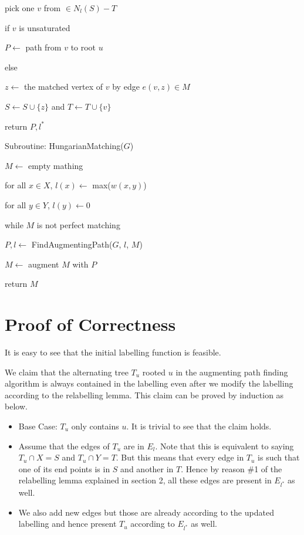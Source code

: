 \documentclass{article}
\begin{document}
\hspace{2cm} pick one $v$ from $\in N_l(S)-T$

\hspace{2cm} if $v$ is unsaturated 

\hspace{3cm} $P \leftarrow$ path from $v$ to root $u$

\hspace{2cm} else

\hspace{3cm} $z \leftarrow$ the matched vertex of $v$ by edge $e(v, z) \in M$

\hspace{3cm} $S \leftarrow S \cup \{z\}$ and $T \leftarrow T \cup \{v\}$

\hspace{1cm} return $P, l^*$

\newpage

Subroutine: HungarianMatching($G$) \dotfill

\hspace{1cm} $M \leftarrow$ empty mathing

\hspace{1cm} for all $x \in X$, $l(x) \leftarrow$ max($w(x, y)$)

\hspace{1cm} for all $y \in Y$, $l(y) \leftarrow 0$ 

\hspace{1cm} while $M$ is not perfect matching

\hspace{2cm} $P, l \leftarrow$ FindAugmentingPath($G$, $l$, $M$)

\hspace{2cm} $M \leftarrow$ augment $M$ with $P$

\hspace{1cm} return $M$

\section{Proof of Correctness}
It is easy to see that the initial labelling function is feasible. 

We claim that the alternating tree $T_u$ rooted $u$ in the augmenting path finding algorithm is always contained in the labelling even after we modify the labelling according to the relabelling lemma. This claim can be proved by induction as below.
\begin{itemize}
    \item Base Case: $T_u$ only contains $u$. It is trivial to see that the claim holds.
    \item Assume that the edges of $T_u$ are in $E_l$. Note that this is equivalent to saying $T_u \cap X = S$ and $T_u \cap Y = T$. But this means that every edge in $T_u$ is such that one of its end points is in $S$ and another in $T$. Hence by reason \#1 of the relabelling lemma explained in section 2, all these edges are present in $E_{l^*}$ as well.
    \item We also add new edges but those are already according to the updated labelling and hence present $T_u$ according to $E_{l^*}$ as well.
\end{itemize}
\end{document}
